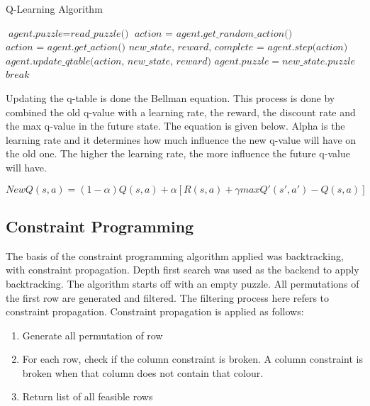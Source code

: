 \documentclass{svproc}
\begin{document}
\begin{algorithm}
	\caption{Q-Learning Algorithm}\label{euclid}
	\begin{algorithmic}[1]
		\State $\textit{agent.puzzle} = \textit{read\_puzzle()}$
		\State $\textit{action = agent.get\_random\_action()}$
		\Else
		\State $\textit{action = agent.get\_action()}$
		\EndIf
		\State $\textit{new\_state, reward, complete = agent.step(action)}$
		\State $\textit{agent.update\_qtable(action, new\_state, reward)}$
		\State $agent.puzzle = new\_state.puzzle$
		\State $\textit{break}$
		\EndIf
		\EndFor
		\EndFor
	\end{algorithmic}
\end{algorithm}

Updating the q-table is done the Bellman equation. This process is done by combined the old q-value with a learning rate, the reward, the discount rate and the max q-value in the future state. The equation is given below. Alpha is the learning rate and it determines how much influence the new q-value will have on the old one. The higher the learning rate, the more influence the future q-value will have.

\begin{equation}
	NewQ(s, a) = (1 - \alpha)Q(s,a) + \alpha[R(s,a) + \gamma maxQ'(s', a') - Q(s,a)]
\end{equation}

\subsection{Constraint Programming}
The basis of the constraint programming algorithm applied was backtracking, with constraint propagation. Depth first search was used as the backend to apply backtracking. The algorithm starts off with an empty puzzle. All permutations of the first row are generated and filtered. The filtering process here refers to  constraint propagation. Constraint propagation is applied as follows:

\begin{enumerate}
    \item Generate all permutation of row
    \item For each row, check if the column constraint is broken. A column constraint is broken when that column does not contain that colour.
    \item Return list of all feasible rows
\end{enumerate}
\end{document}
